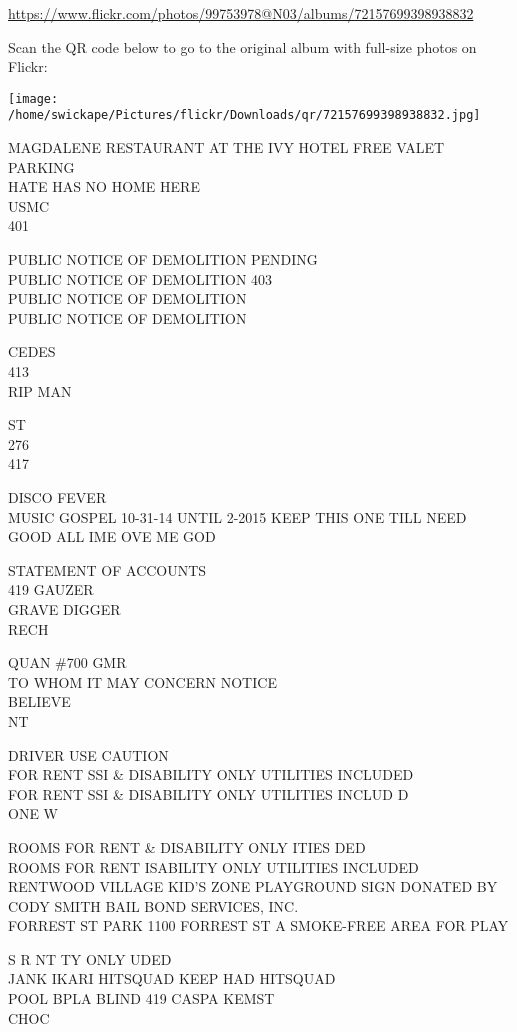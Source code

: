 \documentclass[10pt,letterpaper]{article}
\begin{document}
\url{https://www.flickr.com/photos/99753978@N03/albums/72157699398938832}

Scan the QR code below to go to the original album with full-size photos on Flickr:

\texttt{[image: /home/swickape/Pictures/flickr/Downloads/qr/72157699398938832.jpg]}


MAGDALENE RESTAURANT AT THE IVY HOTEL FREE VALET PARKING\\
HATE HAS NO HOME HERE\\
USMC\\
401

PUBLIC NOTICE OF DEMOLITION PENDING\\
PUBLIC NOTICE OF DEMOLITION 403\\
PUBLIC NOTICE OF DEMOLITION\\
PUBLIC NOTICE OF DEMOLITION

CEDES\\
413\\
RIP MAN

ST\\
276\\
417

DISCO FEVER\\
MUSIC GOSPEL 10{-}31{-}14 UNTIL 2{-}2015 KEEP THIS ONE TILL NEED GOOD ALL IME OVE ME GOD

STATEMENT OF ACCOUNTS\\
419 GAUZER\\
GRAVE DIGGER\\
RECH

QUAN \#700 GMR\\
TO WHOM IT MAY CONCERN NOTICE\\
BELIEVE\\
NT

DRIVER USE CAUTION\\
FOR RENT SSI \& DISABILITY ONLY UTILITIES INCLUDED\\
FOR RENT SSI \& DISABILITY ONLY UTILITIES INCLUD D\\
ONE W

ROOMS FOR RENT \& DISABILITY ONLY ITIES DED\\
ROOMS FOR RENT ISABILITY ONLY UTILITIES INCLUDED\\
RENTWOOD VILLAGE KID'S ZONE PLAYGROUND SIGN DONATED BY CODY SMITH BAIL BOND SERVICES, INC.\\
FORREST ST PARK 1100 FORREST ST A SMOKE{-}FREE AREA FOR PLAY

S R NT TY ONLY UDED\\
JANK IKARI HITSQUAD KEEP HAD HITSQUAD\\
POOL BPLA BLIND 419 CASPA KEMST\\
CHOC
\end{document}
